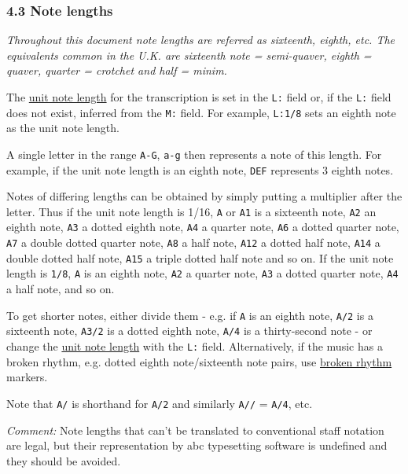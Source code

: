 \documentclass[oneside]{book}
\begin{document}
\hypertarget{note_lengths}{\subsubsection{4.3 Note
lengths}\label{note_lengths}}

\emph{Throughout this document note lengths are referred as sixteenth,
eighth, etc. The equivalents common in the U.K. are sixteenth note =
semi-quaver, eighth = quaver, quarter = crotchet and half = minim.}

The \protect\hyperlink{lunit_note_length}{unit note length} for the
transcription is set in the \texttt{L:} field or, if the \texttt{L:}
field does not exist, inferred from the \texttt{M:} field. For example,
\texttt{L:1/8} sets an eighth note as the unit note length.

A single letter in the range \texttt{A-G}, \texttt{a-g} then represents
a note of this length. For example, if the unit note length is an eighth
note, \texttt{DEF} represents 3 eighth notes.

Notes of differing lengths can be obtained by simply putting a
multiplier after the letter. Thus if the unit note length is 1/16,
\texttt{A} or \texttt{A1} is a sixteenth note, \texttt{A2} an eighth
note, \texttt{A3} a dotted eighth note, \texttt{A4} a quarter note,
\texttt{A6} a dotted quarter note, \texttt{A7} a double dotted quarter
note, \texttt{A8} a half note, \texttt{A12} a dotted half note,
\texttt{A14} a double dotted half note, \texttt{A15} a triple dotted
half note and so on. If the unit note length is \texttt{1/8}, \texttt{A}
is an eighth note, \texttt{A2} a quarter note, \texttt{A3} a dotted
quarter note, \texttt{A4} a half note, and so on.

To get shorter notes, either divide them - e.g. if \texttt{A} is an
eighth note, \texttt{A/2} is a sixteenth note, \texttt{A3/2} is a dotted
eighth note, \texttt{A/4} is a thirty-second note - or change the
\protect\hyperlink{lunit_note_length}{unit note length} with the
\texttt{L:} field. Alternatively, if the music has a broken rhythm, e.g.
dotted eighth note/sixteenth note pairs, use
\protect\hyperlink{broken_rhythm}{broken rhythm} markers.

Note that \texttt{A/} is shorthand for \texttt{A/2} and similarly
\texttt{A//} = \texttt{A/4}, etc.

\emph{Comment:} Note lengths that can't be translated to conventional
staff notation are legal, but their representation by abc typesetting
software is undefined and they should be avoided.
\end{document}
